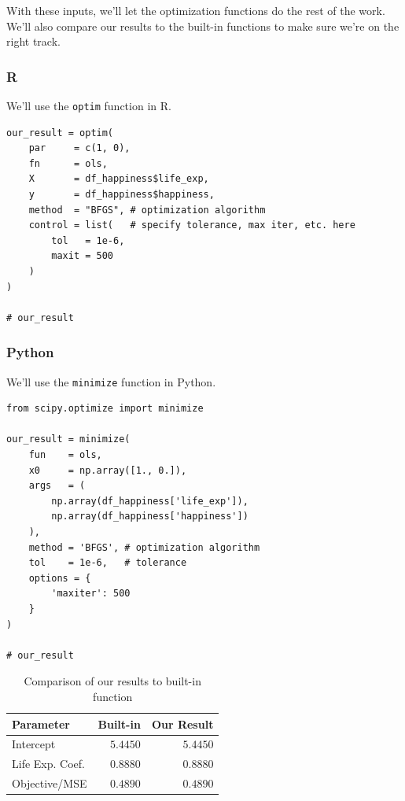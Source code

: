 \documentclass[
  letterpaper,
]{krantz}
\begin{document}
With these inputs, we'll let the optimization functions do the rest of
the work. We'll also compare our results to the built-in functions to
make sure we're on the right track.

\subsubsection{R}

We'll use the \texttt{optim} function in R.

\begin{verbatim}
our_result = optim(
    par     = c(1, 0),
    fn      = ols,
    X       = df_happiness$life_exp,
    y       = df_happiness$happiness,
    method  = "BFGS", # optimization algorithm
    control = list(   # specify tolerance, max iter, etc. here
        tol   = 1e-6,
        maxit = 500
    )  
)

# our_result
\end{verbatim}

\subsubsection{Python}

We'll use the \texttt{minimize} function in Python.

\begin{verbatim}
from scipy.optimize import minimize

our_result = minimize(
    fun    = ols,
    x0     = np.array([1., 0.]),
    args   = (
        np.array(df_happiness['life_exp']), 
        np.array(df_happiness['happiness'])
    ),
    method = 'BFGS', # optimization algorithm
    tol    = 1e-6,   # tolerance
    options = {
        'maxiter': 500
    }
)

# our_result
\end{verbatim}

\hypertarget{tbl-r-optim-ols}{}
\begin{longtable}{lrr}
\caption{\label{tbl-r-optim-ols}Comparison of our results to built-in function }\tabularnewline

\toprule
Parameter & Built-in & Our Result \\ 
\midrule\addlinespace[2.5pt]
Intercept & \textcolor[HTML]{404040}{$5.4450$} & \textcolor[HTML]{404040}{$5.4450$} \\ 
Life Exp. Coef. & \textcolor[HTML]{404040}{$0.8880$} & \textcolor[HTML]{404040}{$0.8880$} \\ 
Objective/MSE & \textcolor[HTML]{404040}{$0.4890$} & \textcolor[HTML]{404040}{$0.4890$} \\ 
\bottomrule
\end{longtable}
\end{document}
